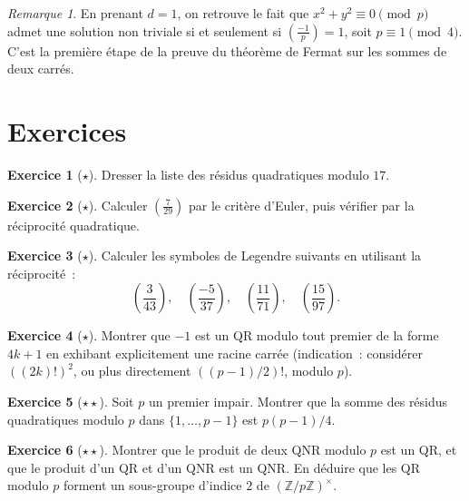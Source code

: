 \documentclass[12pt,a4paper,openany]{book}
\theoremstyle{definition}
\newtheorem{exercice}{Exercice}[chapter]
\theoremstyle{plain}
\theoremstyle{remark}
\newtheorem{remarque}[definition]{Remarque}
\newcommand{\Z}{\mathbb{Z}}
\newcommand{\legendre}[2]{\left(\frac{#1}{#2}\right)}
\begin{document}
\begin{remarque}
\label{rem:fermat-deux-carres}
En prenant $d = 1$, on retrouve le fait que $x^2 + y^2 \equiv 0 \pmod{p}$
admet une solution non triviale si et seulement si $\legendre{-1}{p} = 1$,
soit $p \equiv 1 \pmod{4}$. C'est la première étape de la preuve du théorème de
Fermat sur les sommes de deux carrés.
\end{remarque}

\section{Exercices}
\label{sec:qr:exercices}

\begin{exercice}[$\star$]
\label{exo:qr-1}
Dresser la liste des résidus quadratiques modulo $17$.
\end{exercice}

\begin{exercice}[$\star$]
\label{exo:qr-2}
Calculer $\legendre{7}{29}$ par le critère d'Euler, puis vérifier par la
réciprocité quadratique.
\end{exercice}

\begin{exercice}[$\star$]
\label{exo:qr-3}
Calculer les symboles de Legendre suivants en utilisant la réciprocité~:
\[
  \legendre{3}{43}, \quad \legendre{-5}{37}, \quad \legendre{11}{71}, \quad \legendre{15}{97}.
\]
\end{exercice}

\begin{exercice}[$\star$]
\label{exo:qr-4}
Montrer que $-1$ est un QR modulo tout premier de la forme $4k + 1$
en exhibant explicitement une racine carrée (indication~: considérer
$((2k)!)^2$, ou plus directement $((p-1)/2)!$, modulo $p$).
\end{exercice}

\begin{exercice}[$\star\star$]
\label{exo:qr-5}
Soit $p$ un premier impair. Montrer que la somme des résidus quadratiques
modulo $p$ dans $\{1, \ldots, p-1\}$ est $p(p-1)/4$.
\end{exercice}

\begin{exercice}[$\star\star$]
\label{exo:qr-6}
Montrer que le produit de deux QNR modulo $p$ est un QR, et que le produit
d'un QR et d'un QNR est un QNR. En déduire que les QR modulo $p$ forment
un sous-groupe d'indice $2$ de $(\Z/p\Z)^\times$.
\end{exercice}
\end{document}
